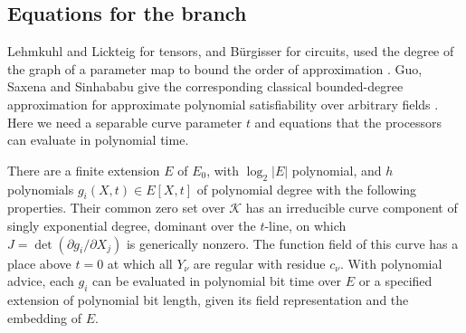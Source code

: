 \subsection{Equations for the branch}

Lehmkuhl and Lickteig for tensors, and B\"urgisser for circuits, used
the degree of the graph of a parameter map to bound the order of
approximation \cite{LehmkuhlLickteig,BurgisserCorrection}. Guo, Saxena and
Sinhababu give the corresponding classical bounded-degree approximation
for approximate polynomial satisfiability over arbitrary fields
\cite[Theorem~4.2]{GSS}. Here we need a separable curve parameter $t$
and equations that the processors can evaluate in polynomial time.

\begin{proposition}\label{prop:descent-curve}
There are a finite extension $E$ of $E_0$, with $\log_2|E|$ polynomial, and
$h$ polynomials $g_i(X,t)\in E[X,t]$ of polynomial degree with the following
properties. Their common zero set over $\mathcal K$ has an irreducible curve
component of singly exponential degree, dominant over the $t$-line, on which
$J=\det(\partial g_i/\partial X_j)$ is generically nonzero. The function
field of this curve has a place above $t=0$ at which all $Y_\nu$ are regular
with residue $c_\nu$. With polynomial advice, each $g_i$ can be evaluated
in polynomial bit time over $E$ or a specified extension of polynomial bit
length, given its field representation and the embedding of $E$.
\end{proposition}

